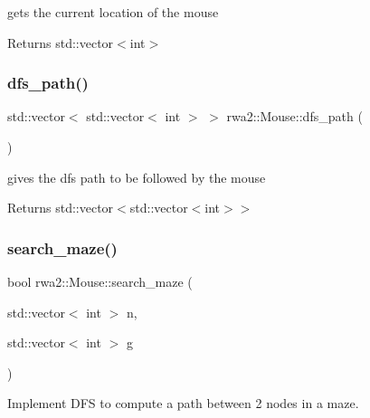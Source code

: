 gets the current location of the mouse 

\begin{DoxyReturn}{Returns}
std\+::vector$<$int$>$ 
\end{DoxyReturn}
\mbox{\label{classrwa2_1_1_mouse_ab9f225398c8ec07767559a47f2070755}} 
\subsubsection{\texorpdfstring{dfs\+\_\+path()}{dfs\_path()}}
{\footnotesize\ttfamily std\+::vector$<$ std\+::vector$<$ int $>$ $>$ rwa2\+::\+Mouse\+::dfs\+\_\+path (\begin{DoxyParamCaption}{ }\end{DoxyParamCaption})}



gives the dfs path to be followed by the mouse 

\begin{DoxyReturn}{Returns}
std\+::vector$<$std\+::vector$<$int$>$$>$ 
\end{DoxyReturn}
\mbox{\label{classrwa2_1_1_mouse_a4b441e30f6c9d446b901f9b21ba104df}} 
\subsubsection{\texorpdfstring{search\+\_\+maze()}{search\_maze()}}
{\footnotesize\ttfamily bool rwa2\+::\+Mouse\+::search\+\_\+maze (\begin{DoxyParamCaption}\item[{std\+::vector$<$ int $>$}]{n,  }\item[{std\+::vector$<$ int $>$}]{g }\end{DoxyParamCaption})}



Implement D\+FS to compute a path between 2 nodes in a maze. 

